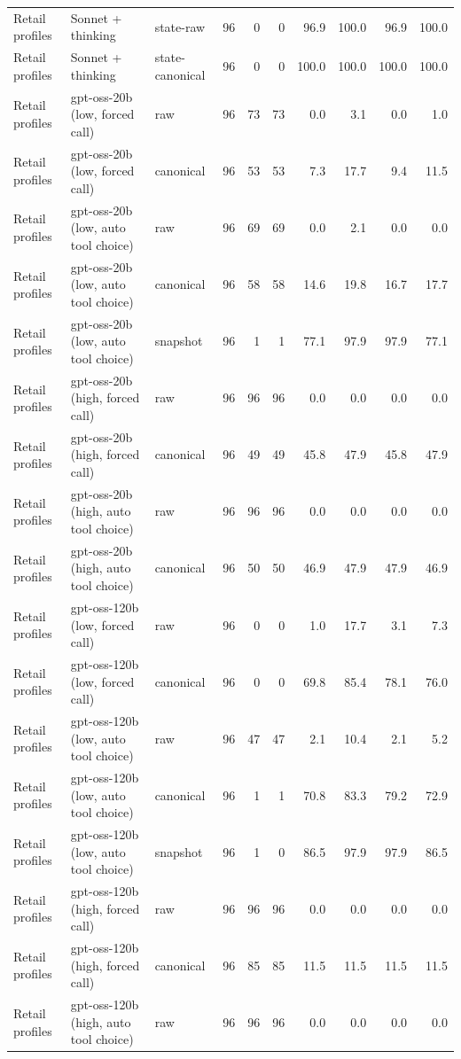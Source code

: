 {\begin{longtable}{lllrrrrrrr}
Retail profiles & Sonnet + thinking & state-raw & 96 & 0 & 0 & 96.9 & 100.0 & 96.9 & 100.0 \\
Retail profiles & Sonnet + thinking & state-canonical & 96 & 0 & 0 & 100.0 & 100.0 & 100.0 & 100.0 \\
Retail profiles & gpt-oss-20b (low, forced call) & raw & 96 & 73 & 73 & 0.0 & 3.1 & 0.0 & 1.0 \\
Retail profiles & gpt-oss-20b (low, forced call) & canonical & 96 & 53 & 53 & 7.3 & 17.7 & 9.4 & 11.5 \\
Retail profiles & gpt-oss-20b (low, auto tool choice) & raw & 96 & 69 & 69 & 0.0 & 2.1 & 0.0 & 0.0 \\
Retail profiles & gpt-oss-20b (low, auto tool choice) & canonical & 96 & 58 & 58 & 14.6 & 19.8 & 16.7 & 17.7 \\
Retail profiles & gpt-oss-20b (low, auto tool choice) & snapshot & 96 & 1 & 1 & 77.1 & 97.9 & 97.9 & 77.1 \\
Retail profiles & gpt-oss-20b (high, forced call) & raw & 96 & 96 & 96 & 0.0 & 0.0 & 0.0 & 0.0 \\
Retail profiles & gpt-oss-20b (high, forced call) & canonical & 96 & 49 & 49 & 45.8 & 47.9 & 45.8 & 47.9 \\
Retail profiles & gpt-oss-20b (high, auto tool choice) & raw & 96 & 96 & 96 & 0.0 & 0.0 & 0.0 & 0.0 \\
Retail profiles & gpt-oss-20b (high, auto tool choice) & canonical & 96 & 50 & 50 & 46.9 & 47.9 & 47.9 & 46.9 \\
Retail profiles & gpt-oss-120b (low, forced call) & raw & 96 & 0 & 0 & 1.0 & 17.7 & 3.1 & 7.3 \\
Retail profiles & gpt-oss-120b (low, forced call) & canonical & 96 & 0 & 0 & 69.8 & 85.4 & 78.1 & 76.0 \\
Retail profiles & gpt-oss-120b (low, auto tool choice) & raw & 96 & 47 & 47 & 2.1 & 10.4 & 2.1 & 5.2 \\
Retail profiles & gpt-oss-120b (low, auto tool choice) & canonical & 96 & 1 & 1 & 70.8 & 83.3 & 79.2 & 72.9 \\
Retail profiles & gpt-oss-120b (low, auto tool choice) & snapshot & 96 & 1 & 0 & 86.5 & 97.9 & 97.9 & 86.5 \\
Retail profiles & gpt-oss-120b (high, forced call) & raw & 96 & 96 & 96 & 0.0 & 0.0 & 0.0 & 0.0 \\
Retail profiles & gpt-oss-120b (high, forced call) & canonical & 96 & 85 & 85 & 11.5 & 11.5 & 11.5 & 11.5 \\
Retail profiles & gpt-oss-120b (high, auto tool choice) & raw & 96 & 96 & 96 & 0.0 & 0.0 & 0.0 & 0.0 \\

\end{longtable}}
